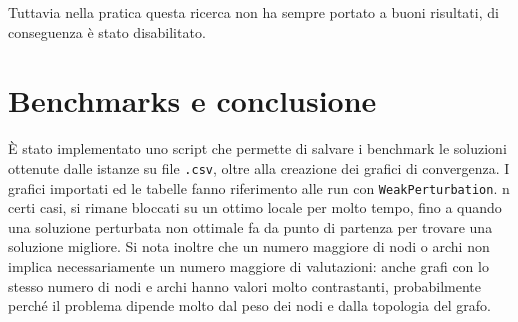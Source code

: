 \documentclass[11pt]{article}
\begin{document}
Tuttavia nella pratica questa ricerca non ha sempre portato a buoni risultati, di conseguenza è stato disabilitato.

\pagebreak

\section{Benchmarks e conclusione}

È stato implementato uno script che permette di salvare i benchmark le soluzioni ottenute dalle istanze su  file \verb|.csv|, oltre alla creazione dei grafici di convergenza.
I grafici importati ed le tabelle fanno riferimento alle run con \verb|WeakPerturbation|. n certi casi, si rimane bloccati su un ottimo locale per molto tempo, fino a quando una soluzione perturbata non ottimale fa da punto di partenza per trovare una soluzione migliore.
Si nota inoltre che un numero maggiore di nodi o archi non implica necessariamente un numero maggiore di valutazioni: anche grafi con lo stesso numero di nodi e archi hanno valori molto contrastanti, probabilmente perché il problema dipende molto dal peso dei nodi e dalla topologia del grafo.
\end{document}
